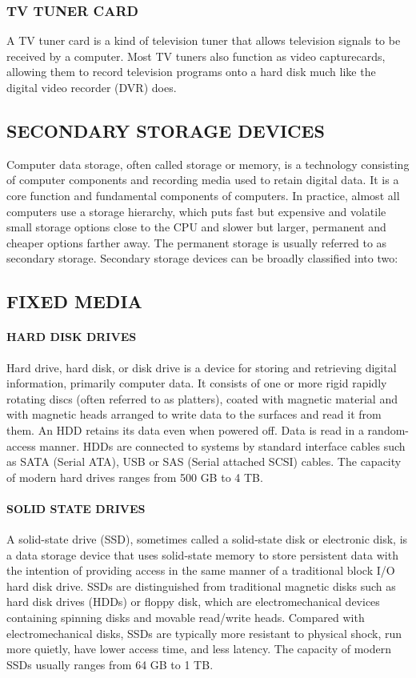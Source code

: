 	\subsubsection*{ TV TUNER CARD}
	 A TV tuner card is a kind of television tuner that allows television signals to be received by
	a computer. Most TV tuners also function as video capturecards, allowing them to record television
	programs onto a hard disk much like the digital video recorder (DVR) does.
	\subsection* {SECONDARY STORAGE DEVICES}
	Computer data storage, often called storage or memory, is a technology consisting of computer components
	and recording media used to retain digital data. It is a core function and fundamental components of
	computers. In practice, almost all computers use a storage hierarchy, which puts fast but expensive and volatile
	small storage options close to the CPU and slower but larger, permanent and cheaper options farther away. The
	permanent storage is usually referred to as secondary storage. Secondary storage devices can be broadly
	classified into two:
	\subsection* {FIXED MEDIA}
	\paragraph*{ HARD DISK DRIVES}
	  Hard drive, hard disk, or disk drive is a device for
	storing and retrieving digital information, primarily computer data. It consists of one or more rigid rapidly rotating discs (often referred to as platters), coated with magnetic material and
	with magnetic heads arranged to write data to the surfaces and read it from them. An HDD retains its
	data even when powered off. Data is read in a random-access manner. HDDs are
	connected to systems by standard interface cables such as SATA (Serial ATA), USB or SAS (Serial
	attached SCSI) cables. The capacity of modern hard drives ranges from 500 GB to 4 TB.
	\paragraph*{ SOLID STATE DRIVES}
	A solid-state drive (SSD), sometimes called a solid-state disk or electronic disk, is a
	data storage device that uses solid-state memory to store persistent data with the intention of providing
	access in the same manner of a traditional block I/O hard disk drive. SSDs are distinguished from
	traditional magnetic disks such as hard disk drives (HDDs) or floppy disk, which are electromechanical
	devices containing spinning disks and movable read/write heads. Compared with electromechanical
	disks, SSDs are typically more resistant to physical shock, run more quietly, have lower access time,
	and less latency. The capacity of modern
	SSDs usually ranges from 64 GB to 1 TB.
